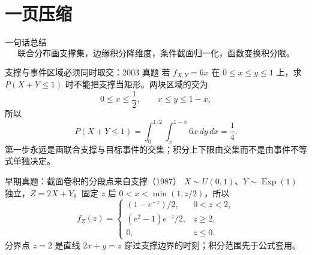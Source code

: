 \documentclass[11pt,a4paper]{ctexart}
\begin{document}
\section{一页压缩}

\begin{corebox}{一句话总结}
\[
\boxed{\text{联合分布画支撑集，边缘积分降维度，条件截面归一化，函数变换积分限。}}
\]
\end{corebox}

\begin{examplebox}{支撑与事件区域必须同时取交：2003 真题}
若 $f_{X,Y}=6x$ 在 $0\le x\le y\le1$ 上，求 $P(X+Y\le1)$ 时不能把支撑当矩形。两块区域的交为
\[
0\le x\le\frac12,\qquad x\le y\le1-x,
\]
所以
\[
P(X+Y\le1)=\int_0^{1/2}\int_x^{1-x}6x\,dy\,dx=\frac14.
\]
第一步永远是画联合支撑与目标事件的交集；积分上下限由交集而不是由事件不等式单独决定。
\end{examplebox}

\begin{examplebox}{早期真题：截面卷积的分段点来自支撑（1987）}
$X\sim U(0,1)$、$Y\sim\operatorname{Exp}(1)$ 独立，$Z=2X+Y$。固定 $z$ 后 $0<x<\min(1,z/2)$，所以
\[
f_Z(z)=\begin{cases}(1-e^{-z})/2,&0<z<2,\\(e^2-1)e^{-z}/2,&z\ge2,\\0,&z\le0.\end{cases}
\]
分界点 $z=2$ 是直线 $2x+y=z$ 穿过支撑边界的时刻；积分范围先于公式套用。
\end{examplebox}
\end{document}
